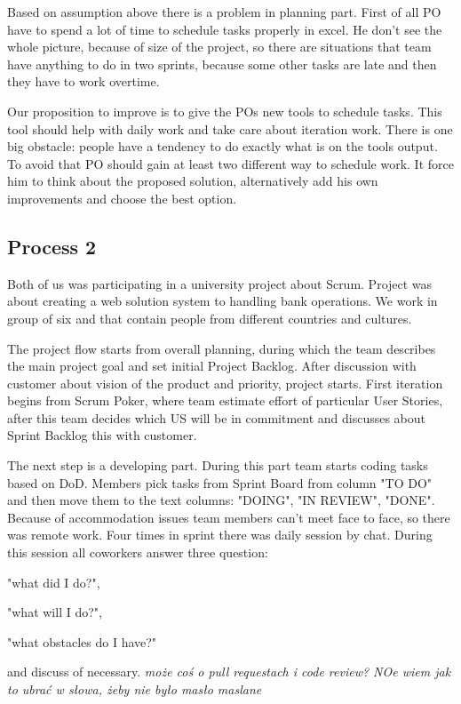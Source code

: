 Based on assumption above there is a problem in planning part. First of all PO have to spend a lot of time to schedule tasks properly in excel. He don't see the whole picture, because of size of the project, so there are situations that team have anything to do in two sprints, because some other tasks are late and then they have to work overtime. 

Our proposition to improve is to give the POs new tools to schedule tasks. This tool should help with daily work and take care about iteration work. There is one big obstacle: people have a tendency to do exactly what is on the tools output. To avoid that PO should gain at least two different way to schedule work. It force him to think about the proposed solution, alternatively add his own improvements and choose the best option. 

\subsection*{Process 2}

Both of us was participating in a university project about Scrum. Project was about creating a web solution system to handling bank operations. We work in group of six and that contain people from different countries and cultures. 

The project flow starts from overall planning, during which the team describes the main project goal and set initial Project Backlog. After discussion with customer about vision of the product and priority, project starts. First iteration begins from Scrum Poker, where team estimate effort of particular User Stories, after this team decides which US will be in commitment and discusses about Sprint Backlog this with customer.

The next step is a developing part. During this part team starts coding tasks based on DoD. Members pick tasks from Sprint Board from column "TO DO" and then move them to the text columns: "DOING", "IN REVIEW", "DONE". Because of accommodation issues team members can't meet face to face, so there was remote work. Four times in sprint there was daily session by chat. During this session all  coworkers answer three question:
\begin{inparaenum}
\item "what did I do?",
\item "what will I do?",
\item "what obstacles do I have?"
\end{inparaenum} and discuss of necessary. \textit{może coś o pull requestach i code review? NOe wiem jak to ubrać w słowa, żeby nie było masło maslane}

